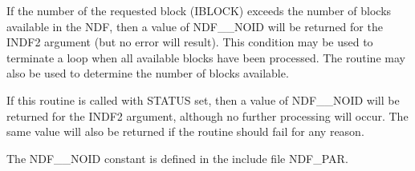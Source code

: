 {{{         \sstitem
         If the number of the requested block (IBLOCK) exceeds the
         number of blocks available in the NDF, then a value of NDF\_\_NOID
         will be returned for the INDF2 argument (but no error will
         result). This condition may be used to terminate a loop when all
         available blocks have been processed. The  routine may
         also be used to determine the number of blocks available.

         \sstitem
         If this routine is called with STATUS set, then a value of
         NDF\_\_NOID will be returned for the INDF2 argument, although no
         further processing will occur. The same value will also be
         returned if the routine should fail for any reason.

         \sstitem
         The NDF\_\_NOID constant is defined in the include file NDF\_PAR.
      }
   }
}
